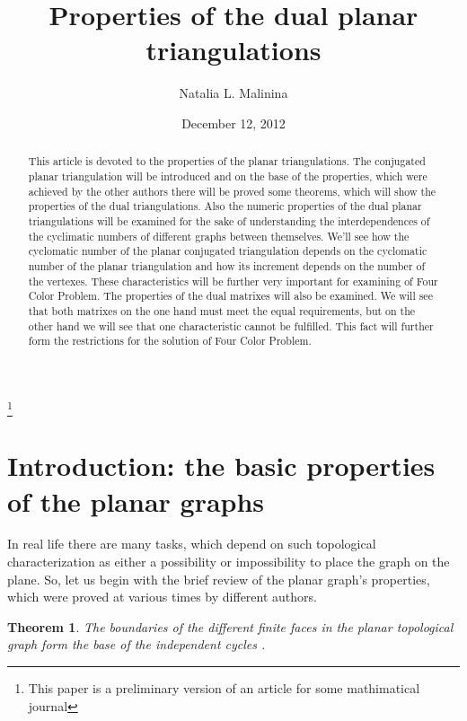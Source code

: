 \documentclass{amsart}
\newtheorem{theorem}{Theorem}
\theoremstyle{plain}
\numberwithin{equation}{section}
\begin{document}
\title[On the solution of Four Color Problem]{Properties of the dual planar triangulations}
\author{Natalia L. Malinina}
\thanks{This paper is a preliminary version of an article for some mathimatical journal}

\date{December 12, 2012}
 

\begin{abstract}
This article is devoted to the properties of the planar triangulations. The conjugated planar triangulation will be introduced and on the base of the properties, which were achieved by the other authors there will be proved some theorems, which will show the properties of the dual triangulations. Also the numeric properties of the dual planar triangulations will be examined for the sake of understanding the interdependences of the cyclimatic numbers of different graphs between themselves. We'll see how the cyclomatic number of the planar conjugated triangulation depends on the cyclomatic number of the planar triangulation and how its increment depends on the number of the vertexes. These characteristics will be further very important for examining of Four Color Problem. The properties of the dual matrixes will also be examined. We will see that both matrixes on the one hand must meet the equal requirements, but on the other hand we will see that one characteristic cannot be fulfilled. This fact will further form the restrictions for the solution of Four Color Problem.

\end{abstract}
\maketitle

\section {Introduction: the basic properties of the planar graphs}
 
In real life there are many tasks, which depend on such topological characterization as either a possibility or impossibility to place the graph on the plane. So, let us begin with the brief review of the planar graph's properties, which were proved at various times by different authors.

\begin {theorem}
The boundaries of the different finite faces in the planar topological graph  form the base of the independent cycles \cite {Berge}.
\end{theorem}
\end{document}
